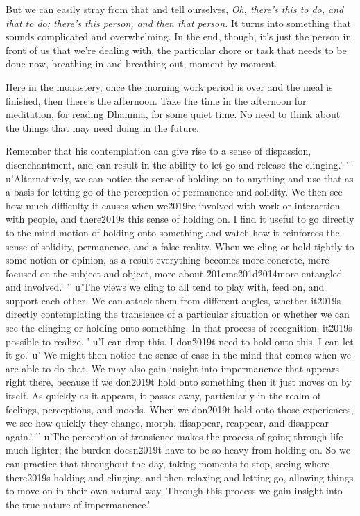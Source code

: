 But we can easily stray from that and tell ourselves, \emph{Oh, there's 
this to do, and that to do; there's this person, and then that person.} 
It turns into something that sounds complicated and overwhelming. In 
the end, though, it's just the person in front of us that we're dealing 
with, the particular chore or task that needs to be done now, breathing 
in and breathing out, moment by moment.

Here in the monastery, once the morning work period is over and the 
meal is finished, then there's the afternoon. Take the time in the 
afternoon for meditation, for reading Dhamma, for some quiet time. No 
need to think about the things that may need doing in the future.

Remember that his contemplation can give rise to a sense of dispassion, disenchantment, and can result in the ability to let go and release the clinging.'
'\n'
u'Alternatively, we can notice the sense of holding on to anything and use that as a basis for letting go of the perception of permanence and solidity. We then see how much difficulty it causes when we\u2019re involved with work or interaction with people, and there\u2019s this sense of holding on. I find it useful to go directly to the mind-motion of holding onto something and watch how it reinforces the sense of solidity, permanence, and a false reality. When we cling or hold tightly to some notion or opinion, as a result everything becomes more concrete, more focused on the subject and object, more about \u201cme\u201d\u2014more entangled and involved.'
'\n'
u'The views we cling to all tend to play with, feed on, and support each other. We can attack them from different angles, whether it\u2019s directly contemplating the transience of a particular situation or whether we can see the clinging or holding onto something. In that process of recognition, it\u2019s possible to realize, '
u'I can drop this. I don\u2019t need to hold onto this. I can let it go.'
u' We might then notice the sense of ease in the mind that comes when we are able to do that. We may also gain insight into impermanence that appears right there, because if we don\u2019t hold onto something then it just moves on by itself. As quickly as it appears, it passes away, particularly in the realm of feelings, perceptions, and moods. When we don\u2019t hold onto those experiences, we see how quickly they change, morph, disappear, reappear, and disappear again.'
'\n'
u'The perception of transience makes the process of going through life much lighter; the burden doesn\u2019t have to be so heavy from holding on. So we can practice that throughout the day, taking moments to stop, seeing where there\u2019s holding and clinging, and then relaxing and letting go, allowing things to move on in their own natural way. Through this process we gain insight into the true nature of impermanence.'
